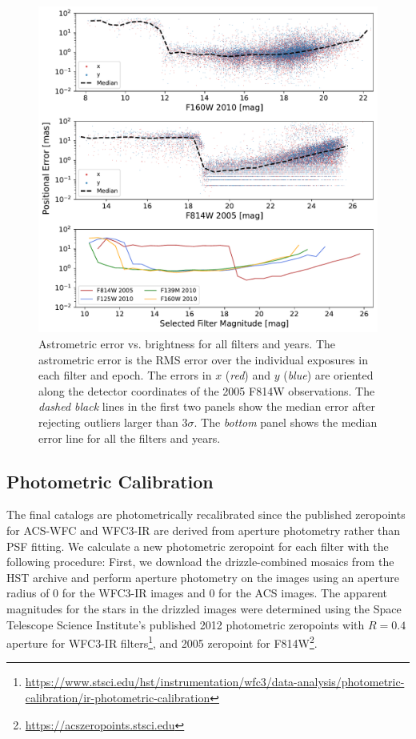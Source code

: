 \documentclass[12pt]{ucsddissertation}
\begin{document}
\begin{CJK*}{UTF8}{gbsn}
\begin{figure}[htb!]
\centering
\includegraphics[width=\linewidth]{figures/chapter2/WD1_Positional_Errors_no_title.pdf}
\caption[Wd1 astrometric error vs. brightness]{Astrometric error vs. brightness for all filters and years. The astrometric error is the RMS error over the individual exposures in each filter and epoch. The errors in $x$ ({\em red}) and $y$ ({\em blue}) are oriented along the detector coordinates of the 2005 F814W observations. The {\em dashed black} lines in the first two panels show the median error after rejecting outliers larger than $3\sigma$. The {\em bottom} panel shows the median error line for all the filters and years.}
\label{fig:astrometric_error}
\end{figure}


\subsection{Photometric Calibration}
\label{wd1-subsec:photometric_calibration}

The final catalogs are photometrically recalibrated since the published zeropoints for ACS-WFC and WFC3-IR are derived from aperture photometry rather than PSF fitting. 
We calculate a new photometric zeropoint for each filter with the following procedure: First, we download the drizzle-combined mosaics from the HST archive and perform aperture photometry on the images using an aperture radius of 0 for the WFC3-IR images and 0 for the ACS images. 
The apparent magnitudes for the stars in the drizzled images were determined using the Space Telescope Science Institute's published 2012 photometric zeropoints with $R=0.4$ aperture for WFC3-IR filters\footnote{\url{https://www.stsci.edu/hst/instrumentation/wfc3/data-analysis/photometric-calibration/ir-photometric-calibration}}, and 2005 zeropoint for F814W\footnote{\url{https://acszeropoints.stsci.edu}}.


\end{CJK*}
\end{document}
